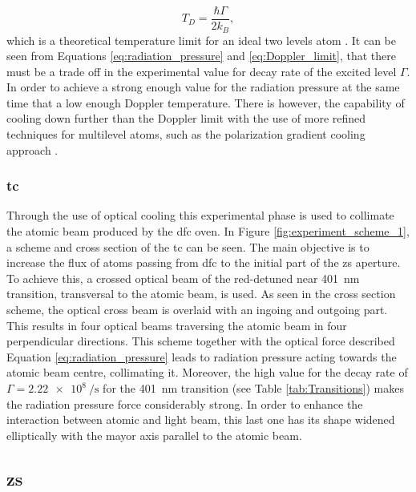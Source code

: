 \begin{equation}\label{eq:Doppler_limit}
	T_D = \frac{\hbar \Gamma}{2 k_B},
\end{equation}
which is a theoretical temperature limit for an ideal two levels atom \cite{Metcalf1999}. It can be seen from Equations \eqref{eq:radiation_pressure} and \eqref{eq:Doppler_limit}, that there must be a trade off in the experimental value for decay rate of the excited level $\Gamma$. In order to achieve a strong enough value for the radiation pressure at the same time that a low enough Doppler temperature. There is however, the capability of cooling down further than the Doppler limit with the use of more refined techniques for multilevel atoms, such as the polarization gradient cooling approach \cite{Dalibard1989}.

\subsubsection{\Acl{tc}}

Through the use of optical cooling this experimental phase is used to collimate the atomic beam produced by the \ac{dfc} oven. In Figure \ref{fig:experiment_scheme_1}, a scheme and cross section of the \ac{tc} can be seen. The main objective is to increase the flux of atoms passing from \ac{dfc} to the initial part of the \ac{zs} aperture. To achieve this, a crossed optical beam of the red-detuned near \SI{401}{\nano\meter} transition, transversal to the atomic beam, is used. As seen in the cross section scheme, the optical cross beam is overlaid with an ingoing and outgoing part. This results in four optical beams traversing the atomic beam in four perpendicular directions. This scheme together with the optical force described Equation \ref{eq:radiation_pressure} leads to radiation pressure acting towards the atomic beam centre, collimating it. Moreover, the high value for the decay rate of $\Gamma = \SI{2.22e8}{\per\second}$ for the \SI{401}{\nano\meter} transition (see Table \ref{tab:Transitions}) makes the radiation pressure force considerably strong. In order to enhance the interaction between atomic and light beam, this last one has its shape widened elliptically with the mayor axis parallel to the atomic beam.


\subsection{\Acl{zs}}

